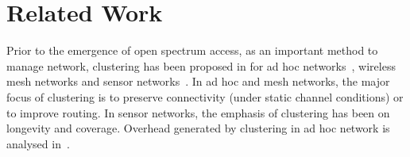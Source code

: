 \documentclass[10pt,journal,compsoc]{IEEEtran}
\theoremstyle{mytheoremstyle}
\theoremstyle{mytheoremstyle}
\theoremstyle{mytheoremstyle}
\begin{document}
\section{Related Work}
\label{related_work}

Prior to the emergence of open spectrum access, as an important method to manage network, clustering has been proposed in for ad hoc networks~\cite{Kawadia03,Lin97adaptiveclustering,Basagni99}, wireless mesh networks and sensor networks~\cite{Abbasi_survey_07}. 
In ad hoc and mesh networks, the major focus of clustering is to preserve connectivity (under static channel conditions) or to improve routing.
In sensor networks, the emphasis of clustering has been on longevity and coverage.
Overhead generated by clustering in ad hoc network is analysed in~\cite{clusterRoutingOverhead02infocom, clusterRoutingOverhead_wcnc04}.
\end{document}
